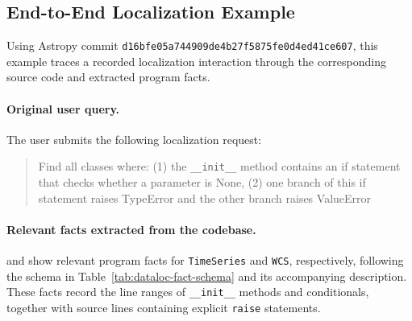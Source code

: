 \subsection{End-to-End Localization Example}\label{sec:end-to-end-dataloc}
\begingroup
{}
Using Astropy commit \mbox{\texttt{d16bfe05a744909de4b27f5875fe0d4ed41ce607}}, this example traces a recorded localization interaction through the corresponding source code and extracted program facts.

\paragraph*{Original user query.}
The user submits the following localization request:
\begin{quote}
Find all classes where: (1) the \texttt{\_\_init\_\_} method contains an if statement that checks whether a parameter is None, (2) one branch of this if statement raises TypeError and the other branch raises ValueError
\end{quote}

\paragraph*{Relevant facts extracted from the codebase.}
 and  show relevant program facts for \texttt{TimeSeries} and \texttt{WCS}, respectively, following the schema in Table~\ref{tab:dataloc-fact-schema} and its accompanying description. These facts record the line ranges of \texttt{\_\_init\_\_} methods and conditionals, together with source lines containing explicit \texttt{raise} statements. 

